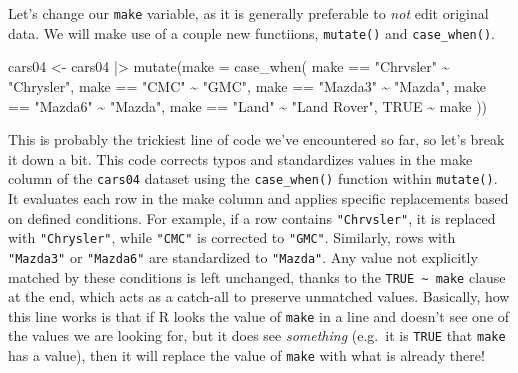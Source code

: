 \documentclass[
  letterpaper,
]{book}
\newenvironment{Shaded}{\begin{snugshade}}{\end{snugshade}}
\newcommand{\AttributeTok}[1]{\textcolor[rgb]{0.40,0.45,0.13}{#1}}
\newcommand{\ConstantTok}[1]{\textcolor[rgb]{0.56,0.35,0.01}{#1}}
\newcommand{\FunctionTok}[1]{\textcolor[rgb]{0.28,0.35,0.67}{#1}}
\newcommand{\NormalTok}[1]{\textcolor[rgb]{0.00,0.23,0.31}{#1}}
\newcommand{\OtherTok}[1]{\textcolor[rgb]{0.00,0.23,0.31}{#1}}
\newcommand{\SpecialCharTok}[1]{\textcolor[rgb]{0.37,0.37,0.37}{#1}}
\newcommand{\StringTok}[1]{\textcolor[rgb]{0.13,0.47,0.30}{#1}}
\begin{document}
Let's change our \texttt{make} variable, as it is generally preferable
to \emph{not} edit original data. We will make use of a couple new
functiions, \texttt{mutate()} and \texttt{case\_when()}.

\begin{Shaded}
\begin{Highlighting}[]
\NormalTok{cars04 }\OtherTok{\textless{}{-}}\NormalTok{ cars04 }\SpecialCharTok{|\textgreater{}} 
  \FunctionTok{mutate}\NormalTok{(}\AttributeTok{make =} \FunctionTok{case\_when}\NormalTok{(}
\NormalTok{    make }\SpecialCharTok{==} \StringTok{"Chrvsler"} \SpecialCharTok{\textasciitilde{}} \StringTok{"Chrysler"}\NormalTok{,}
\NormalTok{    make }\SpecialCharTok{==} \StringTok{"CMC"} \SpecialCharTok{\textasciitilde{}} \StringTok{"GMC"}\NormalTok{,}
\NormalTok{    make }\SpecialCharTok{==} \StringTok{"Mazda3"} \SpecialCharTok{\textasciitilde{}} \StringTok{"Mazda"}\NormalTok{,}
\NormalTok{    make }\SpecialCharTok{==} \StringTok{"Mazda6"} \SpecialCharTok{\textasciitilde{}} \StringTok{"Mazda"}\NormalTok{,}
\NormalTok{    make }\SpecialCharTok{==} \StringTok{"Land"} \SpecialCharTok{\textasciitilde{}} \StringTok{"Land Rover"}\NormalTok{,}
    \ConstantTok{TRUE} \SpecialCharTok{\textasciitilde{}}\NormalTok{ make}
\NormalTok{  ))}
\end{Highlighting}
\end{Shaded}

This is probably the trickiest line of code we've encountered so far, so
let's break it down a bit. This code corrects typos and standardizes
values in the make column of the \texttt{cars04} dataset using the
\texttt{case\_when()} function within \texttt{mutate()}. It evaluates
each row in the make column and applies specific replacements based on
defined conditions. For example, if a row contains \texttt{"Chrvsler"},
it is replaced with \texttt{"Chrysler"}, while \texttt{"CMC"} is
corrected to \texttt{"GMC"}. Similarly, rows with \texttt{"Mazda3"} or
\texttt{"Mazda6"} are standardized to \texttt{"Mazda"}. Any value not
explicitly matched by these conditions is left unchanged, thanks to the
\texttt{TRUE\ \textasciitilde{}\ make} clause at the end, which acts as
a catch-all to preserve unmatched values. Basically, how this line works
is that if R looks the value of \texttt{make} in a line and doesn't see
one of the values we are looking for, but it does see \emph{something}
(e.g.~it is \texttt{TRUE} that \texttt{make} has a value), then it will
replace the value of \texttt{make} with what is already there!
\end{document}
